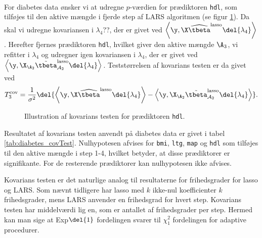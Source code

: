 \begin{eks} \\
For diabetes data ønsker vi at udregne \(p\)-værdien for prædiktoren \texttt{hdl}, som tilføjes til den aktive mængde i fjerde step af LARS algoritmen (se figur \ref{fig:diabetes_covTest}). 
Da skal vi udregne kovariansen i \(\lambda_4\)??, der er givet ved \(\left\langle \y, \X \widehat{\tbeta}^\text{lasso} \del{\lambda_4} \right\rangle\).
Herefter fjernes prædiktoren \texttt{hdl}, hvilket giver den aktive mængde \(\A_{3}\), vi refitter i \(\lambda_4\) og udregner igen kovariansen i \(\lambda_4\), der er givet ved \(\left\langle  \y, \X_{\A_{2}} \tilde{\tbeta}^\text{lasso}_{\mathcal{A}_{2}} \del{\lambda_{4}} \right\rangle\).
Teststørrelsen af kovarians testen er da givet ved
\begin{align*}
T_3^\text{cov} = \frac{1}{\sigma^2} \del{ \left\langle \y, \X \widehat{\tbeta}^\text{lasso} \del{\lambda_{4}} \right\rangle - \left\langle  \y, \X_{\A_{2}} \tilde{\tbeta}^\text{lasso}_{\mathcal{A}_{2}} \del{\lambda_{4}} \right\rangle}.
\end{align*}
%
\begin{figure}[H]
\centering
{}
\caption{Illustration af kovarians testen for prædiktoren \texttt{hdl}.} \label{fig:diabetes_covTest}
\end{figure}
%
Resultatet af kovarians testen anvendt på diabetes data er givet i tabel \ref{tab:diabetes_covTest}.
Nulhypotesen afvises for \texttt{bmi}, \texttt{ltg}, \texttt{map} og \texttt{hdl} som tilføjes til den aktive mængde i step 1-4, hvilket betyder, at disse prædiktorer er signifikante.
For de resterende prædiktorer kan nulhypotesen ikke afvises.
%

\end{eks}

Kovarians testen er det naturlige analog til resultaterne for frihedsgrader for lasso og LARS.
Som nævnt tidligere har lasso med \(k\) ikke-nul koefficienter \(k\) frihedsgrader, mens LARS anvender en frihedsgrad for hvert step.
Kovarians testen har middelværdi lig en, som er antallet af frihedsgrader per step.
Hermed kan man sige at Exp\(\del{1}\) fordelingen svarer til \(\chi_1^2\) fordelingen for adaptive procedurer.

